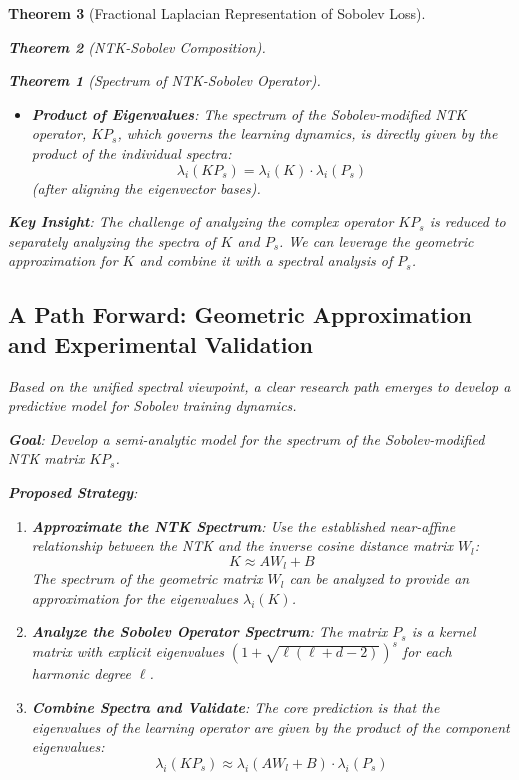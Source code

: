 \documentclass{article}
\newtheorem{theorem}{Theorem}[section]
\begin{document}
\begin{theorem}[Fractional Laplacian Representation of Sobolev Loss]
\begin{theorem}[NTK-Sobolev Composition]
\begin{theorem}[Spectrum of NTK-Sobolev Operator]
\begin{itemize}
    \item \textbf{Product of Eigenvalues}: The spectrum of the Sobolev-modified NTK operator, $K P_s$, which governs the learning dynamics, is directly given by the product of the individual spectra:
    \[ \lambda_i(K P_s) = \lambda_i(K) \cdot \lambda_i(P_s) \]
    (after aligning the eigenvector bases).
\end{itemize}

\textbf{Key Insight}: The challenge of analyzing the complex operator $K P_s$ is reduced to separately analyzing the spectra of $K$ and $P_s$. We can leverage the geometric approximation for $K$ and combine it with a spectral analysis of $P_s$.

\subsection{A Path Forward: Geometric Approximation and Experimental Validation}

Based on the unified spectral viewpoint, a clear research path emerges to develop a predictive model for Sobolev training dynamics.

\textbf{Goal}: Develop a semi-analytic model for the spectrum of the Sobolev-modified NTK matrix $K P_s$.

\textbf{Proposed Strategy}:

\begin{enumerate}
    \item \textbf{Approximate the NTK Spectrum}:
    Use the established near-affine relationship between the NTK and the inverse cosine distance matrix $W_l$:
    \[ K \approx A W_l + B \]
    The spectrum of the geometric matrix $W_l$ can be analyzed to provide an approximation for the eigenvalues $\lambda_i(K)$.

    \item \textbf{Analyze the Sobolev Operator Spectrum}:
    The matrix $P_s$ is a kernel matrix with explicit eigenvalues $(1 + \sqrt{\ell(\ell + d - 2)})^s$ for each harmonic degree $\ell$.

    \item \textbf{Combine Spectra and Validate}:
    The core prediction is that the eigenvalues of the learning operator are given by the product of the component eigenvalues:
    \[ \lambda_i(K P_s) \approx \lambda_i(A W_l + B) \cdot \lambda_i(P_s) \]
    

\end{enumerate}
\end{theorem}
\end{theorem}
\end{theorem}
\end{document}
